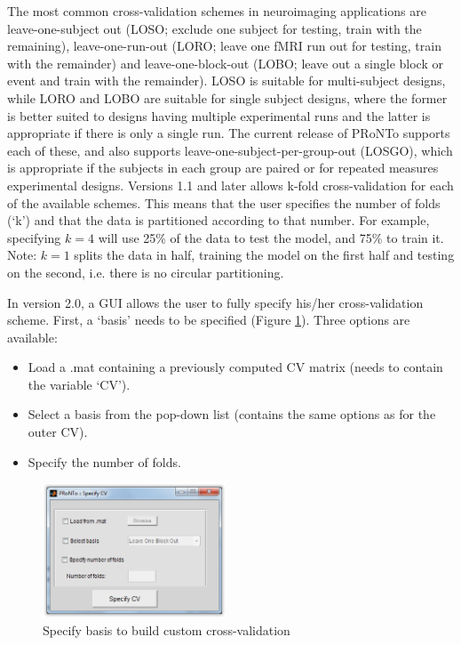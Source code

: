 The most common cross-validation schemes in neuroimaging applications are leave-one-subject out (LOSO; exclude one subject for testing, train with the remaining), leave-one-run-out (LORO; leave one fMRI run out for testing, train with the remainder) and leave-one-block-out (LOBO; leave out a single block or event and train with the remainder). LOSO is suitable for multi-subject designs, while LORO and LOBO are suitable for single subject designs, where the former is better suited to designs having multiple experimental runs and the latter is appropriate if there is only a single run. The current release of PRoNTo supports each of these, and also supports leave-one-subject-per-group-out (LOSGO), which is appropriate if the subjects in each group are paired or for repeated measures experimental designs. Versions 1.1 and later allows k-fold cross-validation for each of the available schemes. This means that the user specifies the number of folds (`k') and that the data is partitioned according to that number. For example, specifying $k=4$ will use 25\% of the data to test the model, and 75\% to train it. Note: $k=1$ splits the data in half, training the model on the first half and testing on the second, i.e. there is no circular partitioning.

In version 2.0, a GUI allows the user to fully specify his/her cross-validation scheme. First, a `basis' needs to be specified (Figure \ref{fig_customCV_basis}). Three options are available: 

\begin{itemize}
\item Load a .mat containing a previously computed CV matrix (needs to contain the variable `CV').
\item Select a basis from the pop-down list (contains the same options as for the outer CV).
\item Specify the number of folds.
\end{itemize}


\begin{figure}[!h]
\begin{center}
\includegraphics[height=4cm]{images/prt_customCV_basis.PNG}
\caption{Specify basis to build custom cross-validation}
 \label{fig_customCV_basis}
\end{center}
\end{figure}


